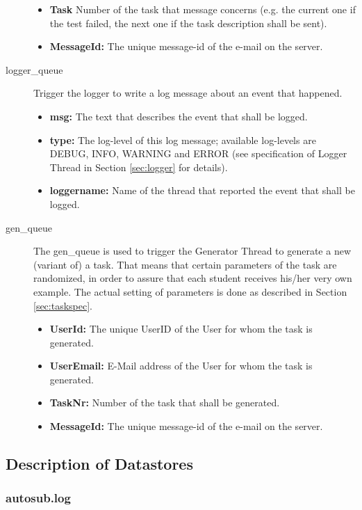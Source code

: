 \begin{description}
\begin{itemize}
        \item {\bf Task} Number of the task that message concerns (e.g. the current one if the test failed, 
        the next one if the task description shall be sent).
        \item {\bf MessageId:} The unique message-id of the e-mail on the server.
    \end{itemize}
\item [logger\_queue] Trigger the logger to write a log message about an event that happened.
    \begin{itemize}
        \item {\bf msg:} The text that describes the event that shall be logged.
        \item {\bf type:} The log-level of this log message; available log-levels are DEBUG, INFO, 
            WARNING and ERROR (see specification of Logger Thread in Section \ref{sec:logger} for details).
        \item {\bf loggername:} Name of the thread that reported the event that shall be logged.
    \end{itemize}
\item [gen\_queue] The gen\_queue is used to trigger the Generator Thread to generate a new (variant of) a 
    task. That means that certain parameters of the task are randomized, in order to assure that each student 
    receives his/her very own example. The actual setting of parameters is done as described 
    in Section \ref{sec:taskspec}.
    \begin{itemize}
        \item {\bf UserId:} The unique UserID of the User for whom the task is generated.
        \item {\bf UserEmail:} E-Mail address of the User for whom the task is generated.
        \item {\bf TaskNr:} Number of the task that shall be generated.
        \item {\bf MessageId:} The unique message-id of the e-mail on the server.
    \end{itemize}
\end{description}

\subsection{Description of Datastores}

\subsubsection{autosub.log}

